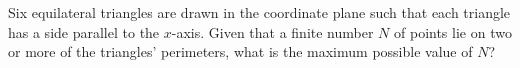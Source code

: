 Six equilateral triangles are drawn in the coordinate plane such that each triangle has a side parallel to the $x$-axis. Given that a finite number $N$ of points lie on two or more of the triangles' perimeters, what is the maximum possible value of $N$?
